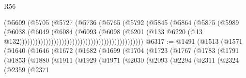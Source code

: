 \begin{lexlean}{R56}
\begin{coremodule}
{{{{{{{{{{{{{{{{{{{{{{{{{{{{{{{{{{{{{{{{{{{{{{{{{{{{{{{{{{{{{{{{{{{{{{{{{{{{{{{{{{{{{{{{{{{{{{{{{{{{{{{{{{{{{{{{{{{{{{{{{{{{{{{{{{{{{{{{{{{{{{{{{{{{{{{{{{{{{{{{{{{{{{{{{{{{{{{{{{{{{{{{{{{{{{{{{{{{{{{{{{{{{{{{{{{                                                              (@5609
                                                                (@5705
                                                                  (@5727
                                                                    (@5736
                                                                      (@5765
                                                                        (@5792
                                                                          (@5845
                                                                            (@5864
                                                                              (@5875
                                                                                (@5989
                                                                                  (@6038
                                                                                    (@6049
                                                                                      (@6084
                                                                                        (@6093
                                                                                          (@6098
                                                                                            (@6201
                                                                                              (@133
                                                                                                @6220
                                                                                                (@13
                                                                                                  @132)))))))))))))))))))))))))))))))))))))))))))))))
@6317 := @1491
    (@1513
      (@1571
        (@1640
          (@1646
            (@1672
              (@1682
                (@1699
                  (@1704
                    (@1723
                      (@1767
                        (@1783
                          (@1791
                            (@1853
                              (@1880
                                (@1911
                                  (@1929
                                    (@1971
                                      (@2030
                                        (@2093
                                          (@2294
                                            (@2311
                                              (@2324
                                                (@2359
                                                  (@2371
}}}}}}}}}}}}}}}}}}}}}}}}}}}}}}}}}}}}}}}}}}}}}}}}}}}}}}}}}}}}}}}}}}}}}}}}}}}}}}}}}}}}}}}}}}}}}}}}}}}}}}}}}}}}}}}}}}}}}}}}}}}}}}}}}}}}}}}}}}}}}}}}}}}}}}}}}}}}}}}}}}}}}}}}}}}}}}}}}}}}}}}}}}}}}}}}}}}}}}}}}}}}}}}}}}}
\end{coremodule}
\end{lexlean}
